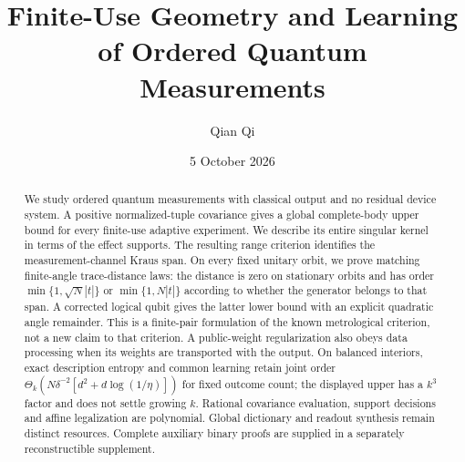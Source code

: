 \documentclass[11pt]{amsart}
\title[Finite-use measurement geometry and learning]{Finite-Use Geometry and Learning of Ordered Quantum Measurements}
\author{Qian Qi}
\date{5 October 2026}
\numberwithin{equation}{section}
\theoremstyle{definition}\newtheorem{definition}[theorem]{Definition}
\theoremstyle{remark}\newtheorem{remark}[theorem]{Remark}
\begin{document}
\raggedbottom
\begin{abstract}
We study ordered quantum measurements with classical output and no residual
device system.  A positive normalized-tuple covariance gives a global
complete-body upper bound for every finite-use adaptive experiment.
We describe its entire singular kernel in terms of the effect supports.
The resulting range criterion identifies the measurement-channel
Kraus span.  On every fixed unitary orbit, we prove matching finite-angle
trace-distance laws: the distance is zero on stationary orbits and has
order $\min\{1,\sqrt N|t|\}$ or $\min\{1,N|t|\}$ according to whether
the generator belongs to that span.  A corrected logical qubit gives
the latter lower bound with an explicit quadratic angle remainder.
This is a finite-pair formulation of the known metrological criterion,
not a new claim to that criterion.  A public-weight regularization also
obeys data processing when its weights are transported with the output.
On balanced interiors, exact description entropy and common learning
retain joint order $\Theta_k(N\delta^{-2}[d^2+d\log(1/\eta)])$ for fixed
outcome count; the displayed upper has a $k^3$ factor and does not settle
growing $k$.  Rational covariance evaluation, support decisions and
affine legalization are polynomial.  Global dictionary and readout
synthesis remain distinct resources.  Complete auxiliary binary proofs
are supplied in a separately reconstructible supplement.
\end{abstract}
\maketitle










\end{document}
